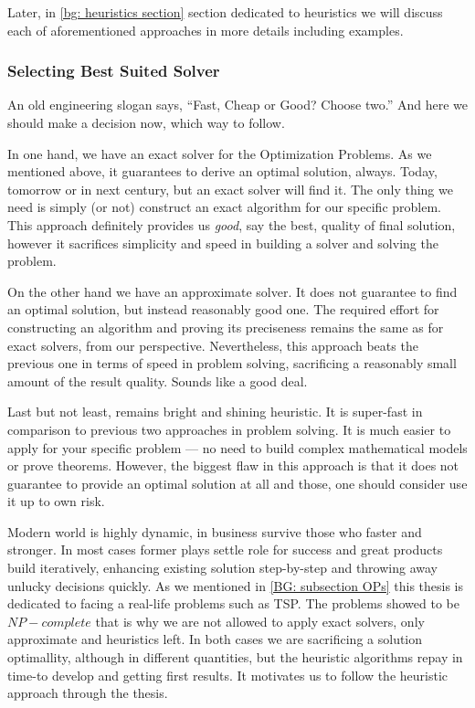 Later, in \ref{bg: heuristics section} section dedicated to heuristics we will discuss each of aforementioned approaches in more details including examples.


\subsubsection{Selecting Best Suited Solver}
An old engineering slogan says, ``Fast, Cheap or Good? Choose two.''
And here we should make a decision now, which way to follow.

In one hand, we have an exact solver for the Optimization Problems. As we mentioned above, it guarantees to derive an optimal solution, always. Today, tomorrow or in next century, but an exact solver will find it. The only thing we need is simply (or not) construct an exact algorithm for our specific problem. This approach definitely provides us \textit{good}, say the best, quality of final solution, however it sacrifices simplicity and speed in building a solver and solving the problem.


On the other hand we have an approximate solver. It does not guarantee to find an optimal solution, but instead reasonably good one. The required effort for constructing an algorithm and proving its preciseness remains the same as for exact solvers, from our perspective. Nevertheless, this approach beats the previous one in terms of speed in problem solving, sacrificing a reasonably small amount of the result quality. Sounds like a good deal.


Last but not least, remains bright and shining heuristic. It is super-fast in comparison to previous two approaches in problem solving. It is much easier to apply for your specific problem — no need to build complex mathematical models or prove theorems. However, the biggest flaw in this approach is that it does not guarantee to provide an optimal solution at all and those, one should consider use it up to own risk.


Modern world is highly dynamic, in business survive those who faster and stronger. In most cases former plays settle role for success and great products build iteratively, enhancing existing solution step-by-step and throwing away unlucky decisions quickly. As we mentioned in \ref{BG: subsection OPs} this thesis is dedicated to facing a real-life problems such as TSP. The problems showed to be $NP-complete$ that is why we are not allowed to apply exact solvers, only approximate and heuristics left. In both cases we are sacrificing a solution optimallity, although in different quantities, but the heuristic algorithms repay in time-to develop and getting first results. It motivates us to follow the heuristic approach through the thesis.

